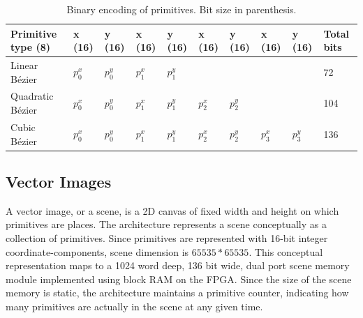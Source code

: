 \begin{table}[h]
    \centering
    \begin{tabular}{|l|l|l|l|l|l|l|l|l|l|}
    \hline
    Primitive type (8) & x (16) & y (16) & x (16) & y (16) & x (16) & y (16) & x (16) & y (16) & Total bits \\ \hline
    Linear Bézier    & \(p_0^x \) & \(p_0^y \) & \(p_1^x \) & \(p_1^y \) & ~   & ~   & ~   & ~   & 72    \\ \hline
    Quadratic Bézier & \(p_0^x \) & \(p_0^y \) & \(p_1^x \) & \(p_1^y \) & \(p_2^x \) & \(p_2^y \) & ~   & ~   & 104   \\ \hline
    Cubic Bézier     & \(p_0^x \) & \(p_0^y \) & \(p_1^x \) & \(p_1^y \) & \(p_2^x \) & \(p_2^y \) & \(p_3^x \) & \(p_3^y \) & 136   \\ \hline
    \end{tabular}
    \caption{Binary encoding of primitives. Bit size in parenthesis.}
	\label{tbl:primitives}
\end{table}

\subsection{Vector Images}

A vector image, or a scene, is a 2D canvas of fixed width and height on which primitives are places.
The \vthreek architecture represents a scene conceptually as a collection of primitives.
Since primitives are represented with 16-bit integer coordinate-components, scene dimension is $65535 * 65535$.
This conceptual representation maps to a 1024 word deep, 136 bit wide, dual port scene memory module implemented using block RAM \cite{xilinx-block-ram} on the FPGA.
Since the size of the scene memory is static, the architecture maintains a primitive counter, indicating how many primitives are actually in the scene at any given time.
